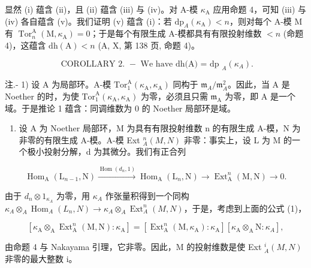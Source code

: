 显然 (i) 蕴含 (ii)，且 (ii) 蕴含 (iii) 与 (iv)。对 A-模 \(\kappa_{\mathrm{A}}\) 应用命题 4，可知 (iii) 与 (iv) 各自蕴含 (v)。我们证明 (v) 蕴含 (i)：若 \(\mathrm{dp}_{A}(\kappa_{\mathrm{A}}) < n\)，则对每个 A-模 M 有 \(\operatorname{Tor}_{n}^{\mathrm{A}}(\mathrm{M}, \kappa_{\mathrm{A}}) = 0\)；于是每个有限生成 A-模都具有有限投射维数 \(< n\) (命题 4)，这蕴含 \(\mathrm{dh}(\mathrm{A}) < n\) (A, X, 第 138 页, 命题 4)。

\[
\text { COROLLARY   2. } - \text { We   have   dh(A) = dp } _ {A} (\kappa_ {A})  .
\]

注.- 1) 设 A 为局部环。A-模 \(\mathrm{Tor}_{1}^{\mathrm{A}}(\kappa_{\mathrm{A}},\kappa_{\mathrm{A}})\) 同构于 \(\mathfrak{m}_{A}/\mathfrak{m}_{A}^{2}\)。因此，当 A 是 Noether 的时，为使 \(\mathrm{Tor}_{1}^{\mathrm{A}}(\kappa_{\mathrm{A}},\kappa_{\mathrm{A}})\) 为零，必须且只需 \(\mathfrak{m}_{\mathrm{A}}\) 为零，即 A 是一个域。于是推论 1 蕴含：同调维数为 0 的 Noether 局部环是域。

\begin{enumerate}
\def\labelenumi{\arabic{enumi})}
\setcounter{enumi}{1}
\tightlist
\item
  设 A 为 Noether 局部环，M 为具有有限投射维数 n 的有限生成 A-模，N 为非零的有限生成 A-模。A-模 Ext \(_{A}^{n}(M,N)\) 非零：事实上，设 L 为 M 的一个极小投射分解，d 为其微分。我们有正合列
\end{enumerate}

\[
\operatorname{Hom} _ {\mathrm{A}} \left(\mathrm{L} _ {n - 1}, \mathrm{N}\right) \xrightarrow {\operatorname{Hom} \left(d _ {n} , 1\right)} \operatorname{Hom} _ {\mathrm{A}} \left(\mathrm{L} _ {n}, \mathrm{N}\right) \longrightarrow \operatorname{Ext} _ {\mathrm{A}} ^ {n} (\mathrm{M}, \mathrm{N}) \rightarrow 0.
\]

由于 \(d_n \otimes 1_{\kappa_A}\) 为零，用 \(\kappa_A\) 作张量积得到一个同构 \(\kappa_A \otimes_A \operatorname{Hom}_A(L_n, N) \longrightarrow \kappa_A \otimes_A \operatorname{Ext}_A^n(M, N)\)，于是，考虑到上面的公式 (1)，

\[
\left[ \kappa_ {\mathrm{A}} \otimes_ {\mathrm{A}} \operatorname{Ext} _ {\mathrm{A}} ^ {n} (\mathrm{M}, \mathrm{N}): \kappa_ {\mathrm{A}} \right] = \left[ \operatorname{Ext} _ {\mathrm{A}} ^ {n} (\mathrm{M}, \kappa_ {\mathrm{A}}): \kappa_ {\mathrm{A}} \right] \left[ \kappa_ {\mathrm{A}} \otimes_ {\mathrm{A}} \mathrm{N}: \kappa_ {A} \right],
\]

由命题 4 与 Nakayama 引理，它非零。因此，M 的投射维数是使 Ext \(_{A}^{i}(M,N)\) 非零的最大整数 i。

